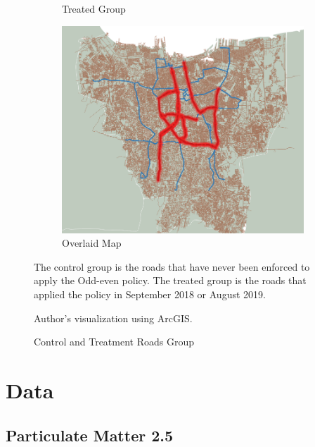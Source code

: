 \documentclass[AEJ]{AEA}
\begin{document}
\begin{figure}
\begin{subfigure}{0.3\textwidth}
        \caption{Treated Group}
        \label{fig:sub2}
    \end{subfigure}
    \hfill
    \begin{subfigure}{0.3\textwidth}
        \includegraphics[width=1\linewidth]{Graphs/overlay.png}
        \caption{Overlaid Map}
        \label{fig:sub3}
    \end{subfigure}

    \caption{Control and Treatment Roads Group}
    \label{fig:overall}
\begin{figurenotes}
The control group is the roads that have never been enforced to apply the Odd-even policy. The treated group is the roads that applied the policy in September 2018 or August 2019.
\end{figurenotes}
\begin{figurenotes}[Source]
Author's visualization using ArcGIS.
\end{figurenotes}
\end{figure}

\vspace{-2.2em}
\section{Data}
\vspace{-1em}
\subsection{Particulate Matter 2.5}
\vspace{-0.5em}
\end{document}
